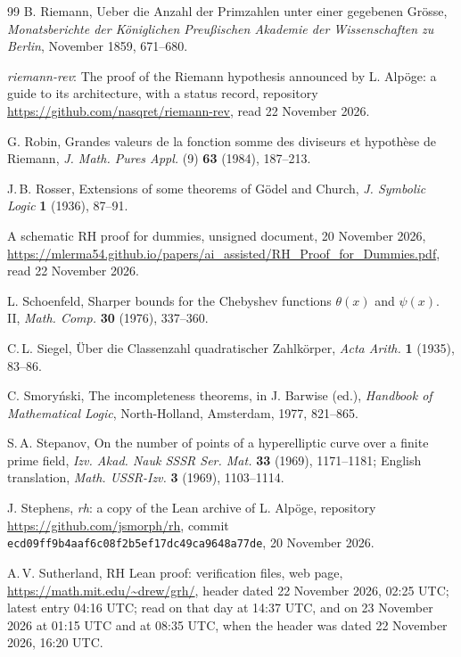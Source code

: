 \documentclass[11pt]{article}
\theoremstyle{definition}
\theoremstyle{remark}
\begin{document}
\begin{thebibliography}{99}
 B. Riemann, Ueber die Anzahl der Primzahlen unter einer gegebenen Gr\"osse, \emph{Monatsberichte der K\"oniglichen Preu\ss ischen Akademie der Wissenschaften zu Berlin}, November 1859, 671--680.

 \emph{riemann-rev}: The proof of the Riemann hypothesis announced by L. Alp\"oge: a guide to its architecture, with a status record, repository \url{https://github.com/nasqret/riemann-rev}, read 22 November 2026.

 G. Robin, Grandes valeurs de la fonction somme des diviseurs et hypoth\`ese de Riemann, \emph{J. Math. Pures Appl.} (9) \textbf{63} (1984), 187--213.

 J.\,B. Rosser, Extensions of some theorems of G\"odel and Church, \emph{J. Symbolic Logic} \textbf{1} (1936), 87--91.

 A schematic RH proof for dummies, unsigned document, 20 November 2026, \url{https://mlerma54.github.io/papers/ai_assisted/RH_Proof_for_Dummies.pdf}, read 22 November 2026.

 L. Schoenfeld, Sharper bounds for the Chebyshev functions $\theta(x)$ and $\psi(x)$. II, \emph{Math. Comp.} \textbf{30} (1976), 337--360.

 C.\,L. Siegel, \"Uber die Classenzahl quadratischer Zahlk\"orper, \emph{Acta Arith.} \textbf{1} (1935), 83--86.

 C. Smory\'nski, The incompleteness theorems, in J. Barwise (ed.), \emph{Handbook of Mathematical Logic}, North-Holland, Amsterdam, 1977, 821--865.

 S.\,A. Stepanov, On the number of points of a hyperelliptic curve over a finite prime field, \emph{Izv. Akad. Nauk SSSR Ser. Mat.} \textbf{33} (1969), 1171--1181; English translation, \emph{Math. USSR-Izv.} \textbf{3} (1969), 1103--1114.

 J. Stephens, \emph{rh}: a copy of the Lean archive of L. Alp\"oge, repository \url{https://github.com/jsmorph/rh}, commit \nolinkurl{ecd09ff9b4aaf6c08f2b5ef17dc49ca9648a77de}, 20 November 2026.

 A.\,V. Sutherland, RH Lean proof: verification files, web page, \url{https://math.mit.edu/~drew/grh/}, header dated 22 November 2026, 02:25 UTC; latest entry 04:16 UTC; read on that day at 14:37 UTC, and on 23 November 2026 at 01:15 UTC and at 08:35 UTC, when the header was dated 22 November 2026, 16:20 UTC.


\end{thebibliography}
\end{document}
